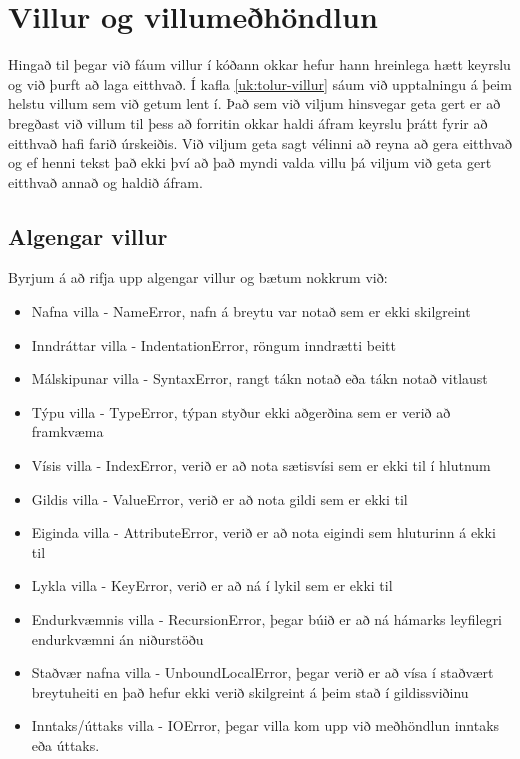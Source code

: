 
\chapter{Villur og villumeðhöndlun}\label{k:villur}
Hingað til þegar við fáum villur í kóðann okkar hefur hann hreinlega hætt keyrslu og við þurft að laga eitthvað.
Í kafla \ref{uk:tolur-villur} sáum við upptalningu á þeim helstu villum sem við getum lent í.
Það sem við viljum hinsvegar geta gert er að bregðast við villum til þess að forritin okkar haldi áfram keyrslu þrátt fyrir að eitthvað hafi farið úrskeiðis.
Við viljum geta sagt vélinni að reyna að gera eitthvað og ef henni tekst það ekki því að það myndi valda villu þá viljum við geta gert eitthvað annað og haldið áfram.

\section{Algengar villur}\label{uk:villur-algengar}
Byrjum á að rifja upp algengar villur og bætum nokkrum við:

\begin{itemize}
	\item Nafna villa - NameError, nafn á breytu var notað sem er ekki skilgreint
	\item Inndráttar villa - IndentationError, röngum inndrætti beitt
	\item Málskipunar villa - SyntaxError, rangt tákn notað eða tákn notað vitlaust
	\item Týpu villa - TypeError, týpan styður ekki aðgerðina sem er verið að framkvæma
	\item Vísis villa - IndexError, verið er að nota sætisvísi sem er ekki til í hlutnum
	\item Gildis villa - ValueError, verið er að nota gildi sem er ekki til
	\item Eiginda villa - AttributeError, verið er að nota eigindi sem hluturinn á ekki til
	\item Lykla villa - KeyError, verið er að ná í lykil sem er ekki til
	\item Endurkvæmnis villa - RecursionError, þegar búið er að ná hámarks leyfilegri endurkvæmni án niðurstöðu
	\item Staðvær nafna villa - UnboundLocalError, þegar verið er að vísa í staðvært breytuheiti en það hefur ekki verið skilgreint á þeim stað í gildissviðinu
	\item Inntaks/úttaks villa - IOError, þegar villa kom upp við meðhöndlun inntaks eða úttaks.
\end{itemize}


